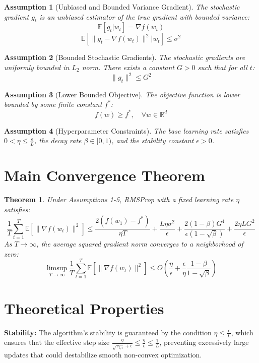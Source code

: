 \documentclass{article}
\newtheorem{theorem}{Theorem}
\newtheorem{assumption}{Assumption}
\begin{document}
\begin{assumption}[Unbiased and Bounded Variance Gradient]
The stochastic gradient $g_t$ is an unbiased estimator of the true gradient with bounded variance:
$$ \mathbb{E}[g_t | w_t] = \nabla f(w_t) $$
$$ \mathbb{E}[\|g_t - \nabla f(w_t)\|^2 | w_t] \leq \sigma^2 $$
\end{assumption}

\begin{assumption}[Bounded Stochastic Gradients]
The stochastic gradients are uniformly bounded in $L_2$ norm. There exists a constant $G > 0$ such that for all $t$:
$$ \|g_t\|^2 \leq G^2 $$
\end{assumption}

\begin{assumption}[Lower Bounded Objective]
The objective function is lower bounded by some finite constant $f^*$:
$$ f(w) \geq f^*, \quad \forall w \in \mathbb{R}^d $$
\end{assumption}

\begin{assumption}[Hyperparameter Constraints]
The base learning rate satisfies $0 < \eta \leq \frac{\epsilon}{L}$, the decay rate $\beta \in [0, 1)$, and the stability constant $\epsilon > 0$.
\end{assumption}

\section*{Main Convergence Theorem}
\begin{theorem}
Under Assumptions 1-5, RMSProp with a fixed learning rate $\eta$ satisfies:
$$ \frac{1}{T} \sum_{t=1}^T \mathbb{E}[\|\nabla f(w_t)\|^2] \leq \frac{2(f(w_1) - f^*)}{\eta T} + \frac{L\eta\sigma^2}{\epsilon} + \frac{2(1-\beta)G^4}{\epsilon(1-\sqrt{\beta})} + \frac{2\eta L G^2}{\epsilon} $$
As $T \to \infty$, the average squared gradient norm converges to a neighborhood of zero:
$$ \limsup_{T \to \infty} \frac{1}{T} \sum_{t=1}^T \mathbb{E}[\|\nabla f(w_t)\|^2] \leq O\left(\frac{\eta}{\epsilon} + \frac{\epsilon}{\eta} \frac{1-\beta}{1-\sqrt{\beta}}\right) $$
\end{theorem}

\section*{Theoretical Properties}
\textbf{Stability:} The algorithm's stability is guaranteed by the condition $\eta \leq \frac{\epsilon}{L}$, which ensures that the effective step size $\frac{\eta}{\sqrt{v_{t,i}}+\epsilon} \leq \frac{\eta}{\epsilon} \leq \frac{1}{L}$, preventing excessively large updates that could destabilize smooth non-convex optimization.
\end{document}
